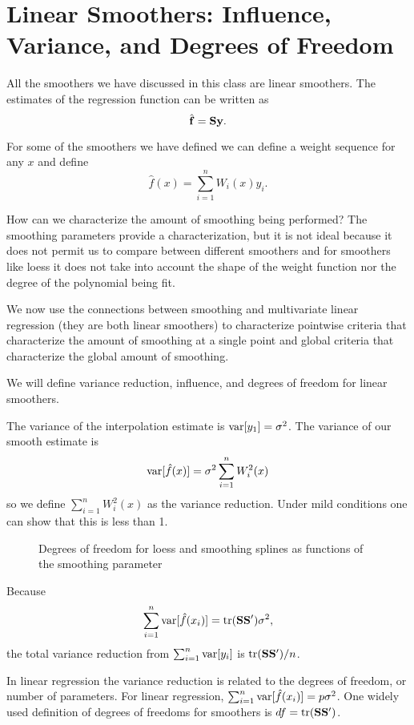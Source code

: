 \section{Linear Smoothers: Influence, Variance, and Degrees of Freedom}
All the smoothers we have discussed in this class are linear
smoothers. The
estimates of the regression function can be written as 
\[
\hat{{\mathbf f}} = {\mathbf S} {\mathbf y}.
\]

For some of the smoothers we have defined we can define a weight sequence
for any $x$ and define
\[
\hat{f}(x) = \sum_{i=1}^n W_i (x) y_i.
\]


How can we characterize the amount of smoothing being performed? The
smoothing parameters provide a characterization, but it is not ideal
because it does not permit us to compare between different smoothers
and for smoothers like loess it does not take into account the shape
of the weight function nor the degree of the polynomial being fit.

We now use the connections between smoothing and multivariate linear
regression (they are both linear smoothers) to characterize pointwise
criteria that characterize the amount of smoothing at a single point
and global criteria that characterize the global amount of smoothing.

We will define variance reduction, influence, and degrees of freedom
for linear smoothers.


The variance of the interpolation estimate is $\mbox{var}[y_1] =
\sigma^2$. The variance of our smooth estimate is 
\[
\mbox{var}[\hat{f}(x)] = \sigma^2 \sum_{i=1}^n W_i^2(x)
\]
so we define $\sum_{i=1}^n W_i^2(x)$ as the variance reduction. Under
mild conditions one can show that this is less than 1.

\begin{figure}[htb]
\caption{Degrees of freedom for loess and smoothing splines as
functions of the smoothing parameter}
\begin{center}
\end{center}
\end{figure}

Because 
\[
\sum_{i=1}^n \mbox{var}[\hat{f}(x_i)] = \mbox{tr}({\mathbf S}{\mathbf S}')\sigma^2,
\]
the total variance reduction from $\sum_{i=1}^n \mbox{var}[y_i]$ is
$\mbox{tr}({\mathbf S}{\mathbf S}')/n$. 


In linear regression the variance reduction is related to the degrees of
freedom, or number of parameters. For linear regression, $\sum_{i=1}^n
\mbox{var}[\hat{f}(x_i)] 
= p \sigma^2$. One widely used definition of degrees of freedoms for
smoothers is $df = \mbox{tr}({\mathbf S}{\mathbf S}')$.

